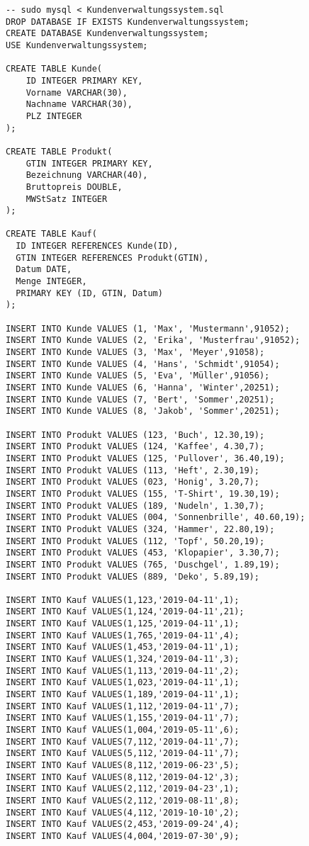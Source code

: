 \documentclass{lehramt-informatik-minimal}
\begin{document}
\begin{verbatim}
-- sudo mysql < Kundenverwaltungssystem.sql
DROP DATABASE IF EXISTS Kundenverwaltungssystem;
CREATE DATABASE Kundenverwaltungssystem;
USE Kundenverwaltungssystem;

CREATE TABLE Kunde(
	ID INTEGER PRIMARY KEY,
	Vorname VARCHAR(30),
	Nachname VARCHAR(30),
	PLZ INTEGER
);

CREATE TABLE Produkt(
	GTIN INTEGER PRIMARY KEY,
	Bezeichnung VARCHAR(40),
	Bruttopreis DOUBLE,
	MWStSatz INTEGER
);

CREATE TABLE Kauf(
  ID INTEGER REFERENCES Kunde(ID),
  GTIN INTEGER REFERENCES Produkt(GTIN),
  Datum DATE,
  Menge INTEGER,
  PRIMARY KEY (ID, GTIN, Datum)
);

INSERT INTO Kunde VALUES (1, 'Max', 'Mustermann',91052);
INSERT INTO Kunde VALUES (2, 'Erika', 'Musterfrau',91052);
INSERT INTO Kunde VALUES (3, 'Max', 'Meyer',91058);
INSERT INTO Kunde VALUES (4, 'Hans', 'Schmidt',91054);
INSERT INTO Kunde VALUES (5, 'Eva', 'Müller',91056);
INSERT INTO Kunde VALUES (6, 'Hanna', 'Winter',20251);
INSERT INTO Kunde VALUES (7, 'Bert', 'Sommer',20251);
INSERT INTO Kunde VALUES (8, 'Jakob', 'Sommer',20251);

INSERT INTO Produkt VALUES (123, 'Buch', 12.30,19);
INSERT INTO Produkt VALUES (124, 'Kaffee', 4.30,7);
INSERT INTO Produkt VALUES (125, 'Pullover', 36.40,19);
INSERT INTO Produkt VALUES (113, 'Heft', 2.30,19);
INSERT INTO Produkt VALUES (023, 'Honig', 3.20,7);
INSERT INTO Produkt VALUES (155, 'T-Shirt', 19.30,19);
INSERT INTO Produkt VALUES (189, 'Nudeln', 1.30,7);
INSERT INTO Produkt VALUES (004, 'Sonnenbrille', 40.60,19);
INSERT INTO Produkt VALUES (324, 'Hammer', 22.80,19);
INSERT INTO Produkt VALUES (112, 'Topf', 50.20,19);
INSERT INTO Produkt VALUES (453, 'Klopapier', 3.30,7);
INSERT INTO Produkt VALUES (765, 'Duschgel', 1.89,19);
INSERT INTO Produkt VALUES (889, 'Deko', 5.89,19);

INSERT INTO Kauf VALUES(1,123,'2019-04-11',1);
INSERT INTO Kauf VALUES(1,124,'2019-04-11',21);
INSERT INTO Kauf VALUES(1,125,'2019-04-11',1);
INSERT INTO Kauf VALUES(1,765,'2019-04-11',4);
INSERT INTO Kauf VALUES(1,453,'2019-04-11',1);
INSERT INTO Kauf VALUES(1,324,'2019-04-11',3);
INSERT INTO Kauf VALUES(1,113,'2019-04-11',2);
INSERT INTO Kauf VALUES(1,023,'2019-04-11',1);
INSERT INTO Kauf VALUES(1,189,'2019-04-11',1);
INSERT INTO Kauf VALUES(1,112,'2019-04-11',7);
INSERT INTO Kauf VALUES(1,155,'2019-04-11',7);
INSERT INTO Kauf VALUES(1,004,'2019-05-11',6);
INSERT INTO Kauf VALUES(7,112,'2019-04-11',7);
INSERT INTO Kauf VALUES(5,112,'2019-04-11',7);
INSERT INTO Kauf VALUES(8,112,'2019-06-23',5);
INSERT INTO Kauf VALUES(8,112,'2019-04-12',3);
INSERT INTO Kauf VALUES(2,112,'2019-04-23',1);
INSERT INTO Kauf VALUES(2,112,'2019-08-11',8);
INSERT INTO Kauf VALUES(4,112,'2019-10-10',2);
INSERT INTO Kauf VALUES(2,453,'2019-09-24',4);
INSERT INTO Kauf VALUES(4,004,'2019-07-30',9);
\end{verbatim}
\end{document}

